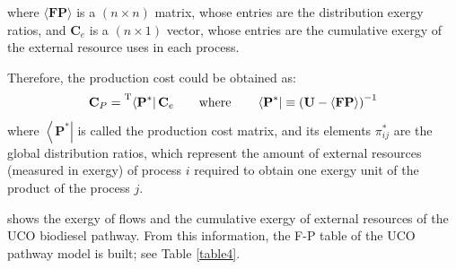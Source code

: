\documentclass[sustainability,article,accept,moreauthors,pdftex,12pt,a4paper]{mdpi}
\newcommand{\mopcr}[1]{\ensuremath{\left\langle {\textbf{#1}^\ast } \right|}}
\newcommand{\tmopcr}[1]{\ensuremath{\prescript{\mathrm{T}}{}{\left\langle {\textbf{#1}^\ast } \right|}}}
\newcommand{\mbr}[1]{\ensuremath{\langle \textbf{#1} \rangle}}
\newcommand{\vm}[1]{\ensuremath{\mathbf{#1}}}
\begin{document}
\noindent where \mbr{FP} is a $(n \times n)$ matrix, whose entries are the distribution exergy ratios, and $\vm{C}_e$ is a $(n \times 1)$ vector, whose entries are the cumulative exergy of the external resource uses in each process.

Therefore, the production cost could be obtained as:
\begin{equation}
 \vm{C}_P =\tmopcr{P} \, \vm{C}_e \qquad \text{where} \qquad \mopcr{P} \equiv \left(\vm{U}-\mbr{FP}\right)^{-1}
 \label{eq4}
\end{equation}
where \mopcr{P} is called the production cost matrix, and its elements $\pi_{ij}^{\ast}$ are the global distribution ratios, which represent the amount of external resources (measured in exergy) of process $i$ required to obtain one exergy unit of the product of the process $j$.

 shows the exergy of flows and the cumulative exergy of external resources of the UCO biodiesel pathway. From this information, the F-P table of the UCO pathway model is built; see Table \ref{table4}.
\end{document}
